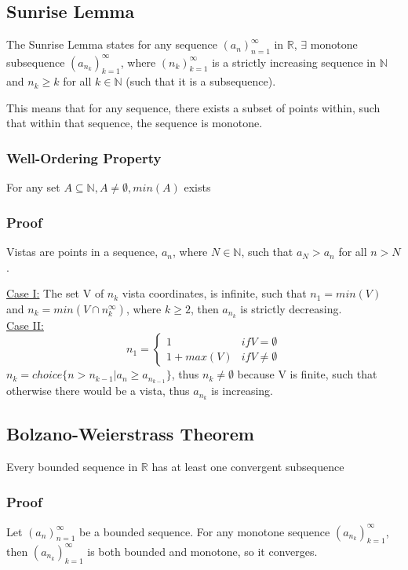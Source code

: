 \documentclass[11 pt, twoside]{article}
\begin{document}
\subsection{Sunrise Lemma}

The Sunrise Lemma states for any sequence $(a_n)^\infty_{n=1}$ in $\mathbb{R}$, $\exists$ monotone subsequence $(a_{n_k})^\infty_{k=1}$, where $(n_k)^\infty_{k=1}$ is a strictly increasing sequence in $\mathbb{N}$ and $n_k \geq k$ for all $k \in \mathbb{N}$ (such that it is a subsequence).

This means that for any sequence, there exists a subset of points within, such that within that sequence, the sequence is monotone.

\subsubsection{Well-Ordering Property}
For any set $A \subseteq \mathbb{N}, A \neq \emptyset, min(A)$ exists

\subsubsection{Proof}
Vistas are points in a sequence, $a_n$, where  $N \in \mathbb{N}$, such that $a_N > a_n$ for all $n > N$.

\underline{Case I:} The set V of $n_k$ vista coordinates, is infinite, such that $n_1 = min(V)$ and $n_k = min(V \cap n_{k}^\infty)$, where $k \geq 2$, then $a_{n_k}$ is strictly decreasing.\\
\underline{Case II:}
\[ n_1 =
\begin{cases}
1 & if V = \emptyset \\
1 + max(V) & if V \neq \emptyset
\end{cases} \]
$n_k = choice\{n > n_{k-1} | a_n \geq a_{n_{k-1}}\}$, thus $n_k \neq \emptyset$ because V is finite, such that otherwise there would be a vista, thus $a_{n_k}$ is increasing.

\subsection{Bolzano-Weierstrass Theorem}
Every bounded sequence in $\mathbb{R}$ has at least one convergent subsequence

\subsubsection{Proof}
Let $(a_n)^\infty_{n=1}$ be a bounded sequence. For any monotone sequence $(a_{n_k})^\infty_{k=1}$, then $(a_{n_k})^\infty_{k=1}$ is both bounded and monotone, so it converges.
\end{document}
